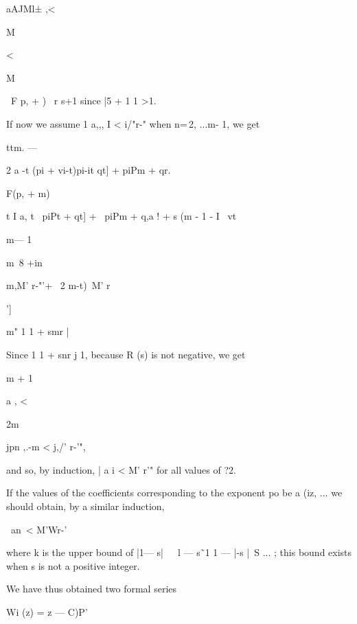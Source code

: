 aAJMl± ,<



M



<



M



\ F p, + ) \ r s+1 since |5 + 1 1 >1.

If now we assume 1 a,,, I < i/"r-" when n=\,2, ...m- 1, we get



ttm. —



2 a -t (pi + vi-t)pi-it qt] + piPm + qr.



F(p, + m)

t I a, t \ piPt + qt] + \ piPm + q,a ! + s (m - 1 - I \ vt






m— 1



m\ 8 +in\



m,M' r-"'+ \ 2 m-t)\ M' r



']



m" 1 1 + smr |

Since 1 1 + snr j 1, because R (s) is not negative, we get

m + 1



a , <



2m



jpn ,.-m < j,/' r-'",



and so, by induction, | a i < M' r'" for all values of ?2.

If the values of the coefficients corresponding to the exponent po be
a (iz, ... we should obtain, by a similar induction,

\ an\ < M'Wr-'\

where k is the upper bound of |1— s|~\ \ l — s\~\ 1 1 — |-s |~S ... ;
this bound exists when s is not a positive integer.

We have thus obtained two formal series



Wi (z) = z — C)P'



